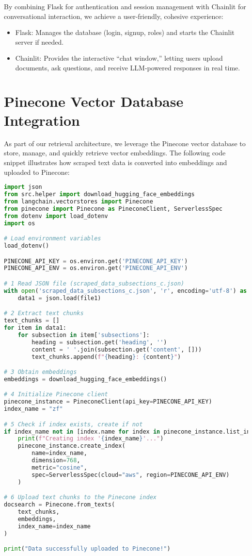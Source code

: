 \noindent
By combining Flask for authentication and session management with Chainlit for conversational interaction, we achieve a user-friendly, cohesive experience:
\begin{itemize}
    \item Flask: Manages the database (login, signup, roles) and starts the Chainlit server if needed.
    \item Chainlit: Provides the interactive “chat window,” letting users upload documents, ask questions, and receive LLM-powered responses in real time.
\end{itemize}

\section{Pinecone Vector Database Integration}
\label{sec:pinecone-db}

As part of our retrieval architecture, we leverage the Pinecone vector database to store, manage, and quickly
retrieve vector embeddings. The following code snippet illustrates how scraped text data is converted into embeddings and
uploaded to Pinecone:

\begin{lstlisting}[language=Python, caption={Storing Scraped Data in Pinecone}, basicstyle=\small\ttfamily]
import json
from src.helper import download_hugging_face_embeddings
from langchain.vectorstores import Pinecone
from pinecone import Pinecone as PineconeClient, ServerlessSpec
from dotenv import load_dotenv
import os

# Load environment variables
load_dotenv()

PINECONE_API_KEY = os.environ.get('PINECONE_API_KEY')
PINECONE_API_ENV = os.environ.get('PINECONE_API_ENV')

# 1 Read JSON file (scraped_data_subsections_c.json)
with open('scraped_data_subsections_c.json', 'r', encoding='utf-8') as file1:
    data1 = json.load(file1)

# 2 Extract text chunks
text_chunks = []
for item in data1:
    for subsection in item['subsections']:
        heading = subsection.get('heading', '')
        content = ' '.join(subsection.get('content', []))
        text_chunks.append(f"{heading}: {content}")

# 3 Obtain embeddings
embeddings = download_hugging_face_embeddings()

# 4 Initialize Pinecone client
pinecone_instance = PineconeClient(api_key=PINECONE_API_KEY)
index_name = "zf"

# 5 Check if index exists, create if not
if index_name not in [index.name for index in pinecone_instance.list_indexes()]:
    print(f"Creating index '{index_name}'...")
    pinecone_instance.create_index(
        name=index_name,
        dimension=768,
        metric="cosine",
        spec=ServerlessSpec(cloud="aws", region=PINECONE_API_ENV)
    )

# 6 Upload text chunks to the Pinecone index
docsearch = Pinecone.from_texts(
    text_chunks,
    embeddings,
    index_name=index_name
)

print("Data successfully uploaded to Pinecone!")
\end{lstlisting}

